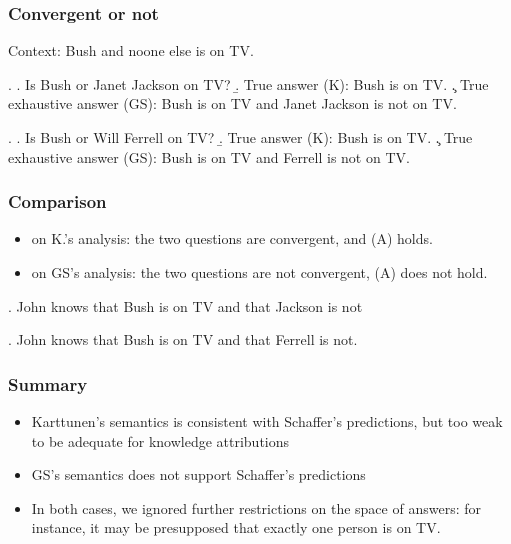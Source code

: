 
\begin{frame}

\frametitle{Convergent or not}

Context: Bush and noone else is on TV.

\ex. \a. Is Bush or Janet Jackson on TV? \b. True answer (K): Bush
is on TV. \c. True exhaustive answer (GS): Bush is on TV and Janet
Jackson is not on TV.\pause

\ex. \a. Is Bush or Will Ferrell on TV? \b. True answer (K): Bush
is on TV. \c. True exhaustive answer (GS): Bush is on TV and
Ferrell is not on TV.

\end{frame}


\begin{frame}

\frametitle{Comparison}

\begin{itemize}

\item on K.'s analysis: the two questions are convergent, and (A)
holds.

\item on GS's analysis: the two questions are not convergent, (A)
does not hold.

\end{itemize}

\ex. John knows that Bush is on TV and that Jackson is not

\ex. John knows that Bush is on TV and that Ferrell is not.


\end{frame}


\begin{frame}

\frametitle{Summary}

\begin{itemize}

\item Karttunen's semantics is consistent with Schaffer's
predictions, but too weak to be adequate for knowledge
attributions\pause

\item GS's semantics does not support Schaffer's predictions\pause

\item In both cases, we ignored further restrictions on the space
of answers: for instance, it may be presupposed that exactly one
person is on TV.

\end{itemize}




\end{frame}
